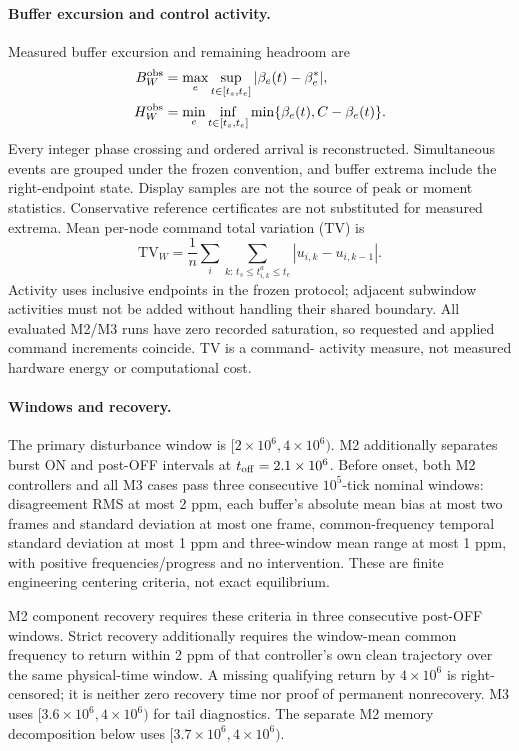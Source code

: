 \paragraph{Buffer excursion and control activity.}
Measured buffer excursion and remaining headroom are
\begin{align}
 B_W^{\rm obs}&=\max_e\sup_{t\in[t_s,t_e]}|\beta_e(t)-\beta_e^*|,\nonumber\\
 H_W^{\rm obs}&=\min_e\inf_{t\in[t_s,t_e]}
                     \min\{\beta_e(t),C-\beta_e(t)\}.
 \label{eq:eval_buffer_metrics}
\end{align}
Every integer phase crossing and ordered arrival is reconstructed.
Simultaneous events are grouped under the frozen convention, and
buffer extrema include the right-endpoint state. Display samples are
not the source of peak or moment statistics. Conservative reference
certificates are not substituted for measured extrema.
Mean per-node command total variation (TV) is
\begin{equation}
 \mathrm{TV}_W=\frac1n\sum_i
       \sum_{k:\,t_s\le t^a_{i,k}\le t_e}|u_{i,k}-u_{i,k-1}|.
 \label{eq:eval_tv}
\end{equation}
Activity uses inclusive endpoints in the frozen protocol; adjacent
subwindow activities must not be added without handling their shared
boundary. All evaluated M2/M3 runs have zero recorded saturation, so
requested and applied command increments coincide. TV is a command-
activity measure, not measured hardware energy or computational cost.

\paragraph{Windows and recovery.}
The primary disturbance window is $[2\times10^6,4\times10^6)$.
M2 additionally separates burst ON and post-OFF intervals at
$t_{\rm off}=2.1\times10^6$. Before onset, both M2 controllers and all
M3 cases pass three consecutive $10^5$-tick nominal windows: disagreement
RMS at most 2 ppm, each buffer's absolute mean bias at most two frames
and standard deviation at most one frame, common-frequency temporal
standard deviation at most 1 ppm and three-window mean range at most
1 ppm, with positive frequencies/progress and no intervention. These
are finite engineering centering criteria, not exact equilibrium.

M2 component recovery requires these criteria in three consecutive
post-OFF windows. Strict recovery additionally requires the window-mean common
frequency to return within 2 ppm of that controller's own clean
trajectory over the same physical-time window. A missing qualifying return by
$4\times10^6$ is right-censored; it is neither zero recovery time nor
proof of permanent nonrecovery. M3 uses $[3.6\times10^6,4\times10^6)$
for tail diagnostics. The separate M2 memory decomposition below uses
$[3.7\times10^6,4\times10^6)$.

